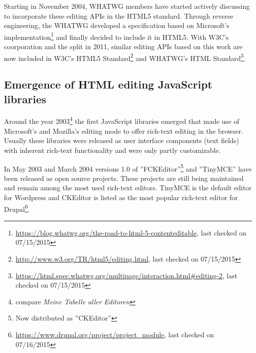
Starting in November 2004, WHATWG members have started actively discussing to incorporate these editing APIs in the HTML5 standard. Through reverse engineering, the WHATWG developed a specification based on Microsoft's implementation\footnote{\url{https://blog.whatwg.org/the-road-to-html-5-contenteditable}, last checked on 07/15/2015} and finally decided to include it in HTML5. With W3C's coorporation and the split in 2011, similar editing APIs based on this work are now included in W3C's HTML5 Standard\footnote{\url{http://www.w3.org/TR/html5/editing.html}, last checked on 07/15/2015} and WHATWG's HTML Standard\footnote{\url{https://html.spec.whatwg.org/multipage/interaction.html#editing-2}, last checked on 07/15/2015}.

\subsection{Emergence of HTML editing JavaScript libraries}

Around the year 2003\footnote{compare \textit{Meine Tabelle aller Editoren}} the first JavaScript libraries emerged that made use of Microsoft's and Mozilla's editing mode to offer rich-text editing in the browser. Usually these libraries were released as user interface components (text fields) with inherent rich-text functionality and were only partly customizable.

In May 2003 and March 2004 versions 1.0 of ''FCKEditor''\footnote{Now distributed as ''CKEditor''} and ''TinyMCE'' have been released as open source projects. These projects are still being maintained and remain among the most used rich-text editors. TinyMCE is the default editor for Wordpress and CKEditor is listed as the most popular rich-text editor for Drupal\footnote{\url{https://www.drupal.org/project/project\_module}, last checked on 07/16/2015}. 

